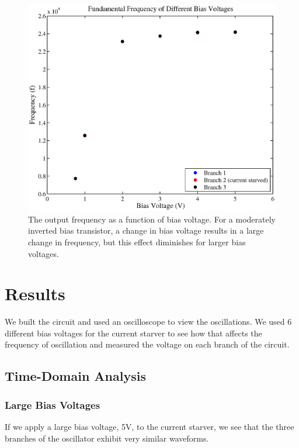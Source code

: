 \documentclass{article}
\begin{document}
\begin{figure}[H]
\centering
\includegraphics[scale=.7]{biasFrequenciesSim.eps}
\caption{The output frequency as a function of bias voltage. For a moderately inverted bias transistor, a change in bias voltage results in a large change in frequency, but this effect diminishes for larger bias voltages.}
\label{biasFrequenciesSim}
\end{figure}

\section*{Results}

We built the circuit and used an oscilloscope to view the oscillations.  We used 6 different bias voltages for the current starver to see how that affects the frequency of oscillation and measured the voltage on each branch of the circuit.

\subsection*{Time-Domain Analysis}

\subsubsection*{Large Bias Voltages}

If we apply a large bias voltage, 5V, to the current starver, we see that the three branches of the oscillator exhibit very similar waveforms.
\end{document}
